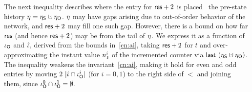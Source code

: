 The next inequality describes where the entry for $\mathsf{res} + 2$ is placed
\wrt~the pre-state history $\gist = \gists \hunion \gisto$. $\eta$
may have gaps arising due to out-of-order behavior of the network, and
$\mathsf{res} + 2$ may fill one such gap. However, there is a bound on how far
$\mathsf{res}$ (and hence $\mathsf{res}+2$) may be from the tail of $\eta$. We
express it as a function of $\iota_{\mathsf{O}}$ and $\hat{\iota}$, derived from the
bounds in~\ref{cn:ai}, taking $\mathsf{res} + 2$ for $t$ and
over-approximating the instant value $n_{{\mathsf{J}}}^i$ of the
incremented counter via $\last~(\gists \hunion \gisto)$. The
inequality weakens the invariant~\ref{cn:ai}, making it hold for even
and odd entries by moving $2~|\hat{\iota} \cap \iota_{\mathsf{O}}^i|$ (for $i = 0,1$) to
the right side of $<$ and joining them, since $\iota_{\mathsf{O}}^0 \cap \iota_{\mathsf{O}}^1 =
\emptyset$.


